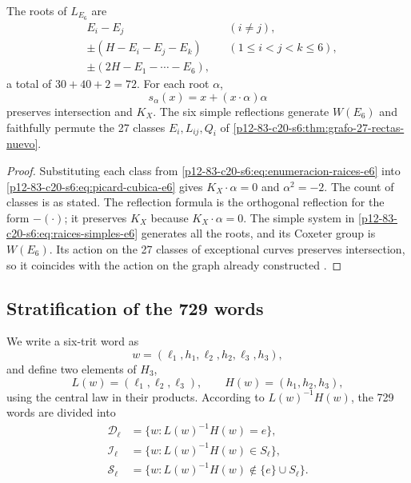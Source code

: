 \begin{proposition}
\label{p12-83-c20-s6:prop:setenta-dos-raices-e6}
The roots of \(L_{E_6}\) are
\begin{equation}
 \begin{aligned}
 &E_i-E_j &&(i\ne j),\\
 &\pm(H-E_i-E_j-E_k) &&(1\le i<j<k\le6),\\
 &\pm(2H-E_1-\cdots-E_6),
 \end{aligned}
 \label{p12-83-c20-s6:eq:enumeracion-raices-e6}
\end{equation}
a total of \(30+40+2=72\). For each root \(\alpha\),
\begin{equation}
 s_\alpha(x)=x+(x\cdot\alpha)\alpha
 \label{p12-83-c20-s6:eq:reflexion-raiz-e6}
\end{equation}
preserves intersection and \(K_X\). The six simple reflections generate
\(W(E_6)\) and faithfully permute the 27 classes
\(E_i,L_{ij},Q_i\) of \cref{p12-83-c20-s6:thm:grafo-27-rectas-nuevo}.
\end{proposition}

\begin{proof}
Substituting each class from \cref{p12-83-c20-s6:eq:enumeracion-raices-e6} into
\cref{p12-83-c20-s6:eq:picard-cubica-e6} gives \(K_X\cdot\alpha=0\) and
\(\alpha^2=-2\). The count of classes is as stated. The reflection formula
is the orthogonal reflection for the form \(-(\cdot)\); it preserves \(K_X\) because
\(K_X\cdot\alpha=0\). The simple system in
\cref{p12-83-c20-s6:eq:raices-simples-e6} generates all the roots, and its Coxeter group is
\(W(E_6)\). Its action on the 27 classes of exceptional curves preserves
intersection, so it coincides with the action on the graph already
constructed \cite{Manivel2005}.
\end{proof}

\subsection{Stratification of the 729 words}

We write a six-trit word as
\[
 w=(\ell_1,h_1,\ell_2,h_2,\ell_3,h_3),
\]
and define two elements of \(H_3\),
\[
 L(w)=(\ell_1,\ell_2,\ell_3),\qquad
 H(w)=(h_1,h_2,h_3),
\]
using the central law in their products. According to
\(L(w)^{-1}H(w)\), the 729 words are divided into
\begin{align*}
 \mathcal D_\ell&=\{w:L(w)^{-1}H(w)=e\},\\
 \mathcal I_\ell&=\{w:L(w)^{-1}H(w)\in S_\ell\},\\
 \mathcal S_\ell&=\{w:L(w)^{-1}H(w)\notin\{e\}\cup S_\ell\}.
\end{align*}

